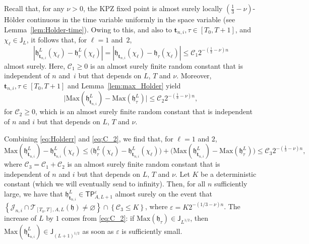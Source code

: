 \documentclass[oneside,final,11pt]{amsart}
\theoremstyle{definition}
\newcommand{\fh}{\mathfrak{h}}
\newcommand{\TP}[1]{\mathsf{TP}_{\!\!#1}}
\newcommand{\bJ}{\mathsf{J}}
\newcommand{\CT}{\mathcal{T}}
\newcommand{\CC}{\mathcal{C}}
\newcommand{\1}[1]{\mathbf{1}_{#1}}
\newcommand{\eps}{\varepsilon}
\newcommand{\ic}[1]{\marginnote{\tiny{\color{green!65!black}[IC: #1]}}}
\newcommand{\Max}{\mathrm{Max}}
\newcommand{\ft}{\mathbf{t}}
\newcommand{\CJ}{\mathcal{J}}
\let\emptyset\varnothing
\numberwithin{equation}{section}
\begin{document}
Recall that, for any $\nu > 0$, the KPZ fixed point is almost surely locally $(\tfrac{1}{3}-\nu)$-H\"{o}lder continuous in the time variable uniformly in the space variable (see Lemma~\ref{lem:Holder-time}). Owing to this, and also to $\ft_{n,i}, \tau \in [T_0, T+1]$, and $\chi_\ell \in \bJ_L$, it follows that, for $\ell = 1$ and~$2$,
\begin{equation}\label{eq:Holderr}
|\fh^L_{\ft_{n,i}}(\chi_\ell) - \fh^L_{\tau}(\chi_\ell)| = |\fh_{\ft_{n,i}}(\chi_\ell) - \fh_{\tau}(\chi_\ell)| \leq \CC_1 2^{-(\frac{1}{3}-\nu) n}
\end{equation}
almost surely. Here,  $\CC_1 \geq 0$ is an almost surely finite random constant that is independent of $n$ and~$i$ but that depends on $L$, $T$ and $\nu$. Moreover, $\ft_{n,i}, \tau \in [T_0, T+1]$ and Lemma~\ref{lem:max_Holder} yield
\begin{equation}\label{eq:C_2}
	\bigl| \Max(\fh^L_{\ft_{n,i}}) - \Max(\fh^L_{\tau}) \bigr| \leq \CC_2 2^{-(\frac{1}{3}-\nu) n},
\end{equation}
for $\CC_2 \geq 0$, which  is an almost surely finite random constant that is independent of $n$ and $i$ but that depends on $L$, $T$ and $\nu$.

Combining \eqref{eq:Holderr} and \eqref{eq:C_2}, we find that, for $\ell = 1$ and $2$,
%
\begin{equation}%
\Max(\fh^L_{\ft_{n,i}}) - \fh^L_{\ft_{n,i}}(\chi_\ell) \leq \bigl(\fh^L_{\tau}(\chi_\ell) - \fh^L_{\ft_{n,i}}(\chi_\ell)\bigr) + \bigl(\Max(\fh^L_{\ft_{n,i}}) - \Max(\fh^L_{\tau})\bigr) \leq \CC_3 2^{-(\frac{1}{3}-\nu) n},
\end{equation}
%
where $\CC_3 = \CC_1 + \CC_2$ is an almost surely finite random constant that is independent of $n$ and $i$ but that depends on $L$, $T$ and $\nu$. Let $K$ be a deterministic constant (which we will eventually send to infinity). Then, for all $n$ sufficiently large, we have that $\fh^L_{\ft_{n,i}} \in \TP{A, L + 1}^{\eps}$ almost surely on the event that $\left\{\CJ_{n, i} \cap \CT_{[T_0, T], A, L}(\fh) \neq \emptyset\right\}\cap\left\{\CC_3 \leq K\right\}$, where $\eps = K 2^{-( 1 / 3-\nu)n}$. The increase of $L$ by $1$ comes from \eqref{eq:C_2}: if $\Max(\fh_{\tau}) \in \bJ_{L^{1/2}}$, then $\Max(\fh^L_{\ft_{n,i}}) \in \bJ_{(L + 1)^{1/2}}$ as soon as $\eps$ is sufficiently small.
\medskip
\end{document}
